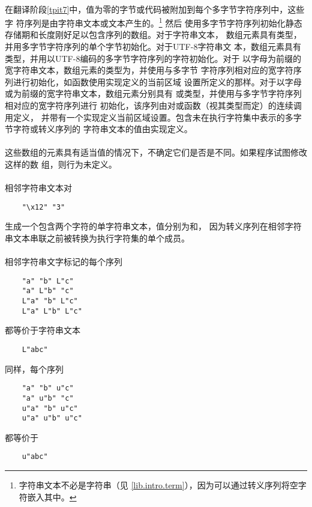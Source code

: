 \paragraph{}
在翻译阶段\ref{tpit7}中，值为零的字节或代码被附加到每个多字节字符序列中，这些字
符序列是由字符串文本或文本产生的。\footnote{字符串文本不必是字符串（见
\ref{lib.intro.term}），因为可以通过转义序列将空字符嵌入其中。}  然后
使用多字节字符序列初始化静态存储期和长度刚好足以包含序列的数组。对于字符串文本，
数组元素具有类型，并用多字节字符序列的单个字节初始化。对于UTF-8字符串文
本，数组元素具有类型，并用以UTF-8编码的多字节字符序列的字符初始化。对于
以字母为前缀的宽字符串文本，数组元素的类型为，并使用与多字节
字符序列相对应的宽字符序列进行初始化，如函数使用实现定义的当前区域
设置所定义的那样。对于以字母或为前缀的宽字符串文本，数组元素分别具有
或类型，并使用与多字节字符序列相对应的宽字符序列进行
初始化，该序列由对或函数（视其类型而定）的连续调用定义，
并带有一个实现定义当前区域设置。包含未在执行字符集中表示的多字节字符或转义序列的
字符串文本的值由实现定义。

\paragraph{}
这些数组的元素具有适当值的情况下，不确定它们是否是不同。如果程序试图修改这样的数
组，则行为未定义。

\paragraph{}
\ex 相邻字符串文本对
\begin{lstlisting}
    "\x12" "3"
\end{lstlisting}
生成一个包含两个字符的单字符串文本，值分别为和\tm{\sq 3\sq}，
因为转义序列在相邻字符串文本串联之前被转换为执行字符集的单个成员。

\paragraph{}
\ex 相邻字符串文字标记的每个序列
\begin{lstlisting}
    "a" "b" L"c"
    "a" L"b" "c"
    L"a" "b" L"c"
    L"a" L"b" L"c"
\end{lstlisting}
都等价于字符串文本
\begin{lstlisting}
    L"abc"
\end{lstlisting}
同样，每个序列
\begin{lstlisting}
    "a" "b" u"c"
    "a" u"b" "c"
    u"a" "b" u"c"
    u"a" u"b" u"c"
\end{lstlisting}
都等价于
\begin{lstlisting}
    u"abc"
\end{lstlisting}

